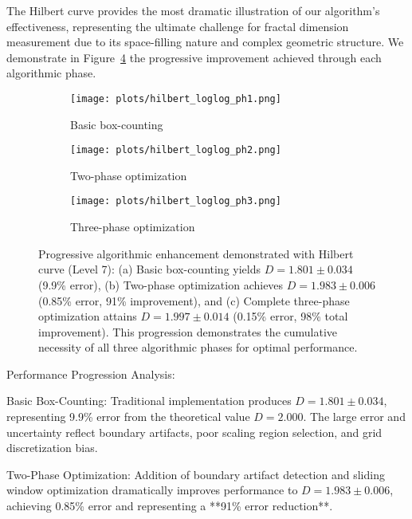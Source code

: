 \documentclass[preprint,12pt]{elsarticle}
\def\textbf#1{#1}%
\begin{document}
The Hilbert curve provides the most dramatic illustration of our algorithm's effectiveness, representing the ultimate challenge for fractal dimension measurement due to its space-filling nature and complex geometric structure. We demonstrate in Figure~\ref{fig:hilbert_progression} the progressive improvement achieved through each algorithmic phase.

\begin{figure}[H]
\centering
\begin{subfigure}[b]{0.32\textwidth}
    \centering
    \texttt{[image: plots/hilbert\_loglog\_ph1.png]}
    \caption{Basic box-counting}
    \label{fig:hilbert_basic}
\end{subfigure}
\hfill
\begin{subfigure}[b]{0.32\textwidth}
    \centering
    \texttt{[image: plots/hilbert\_loglog\_ph2.png]}
    \caption{Two-phase optimization}
    \label{fig:hilbert_two_phase}
\end{subfigure}
\hfill
\begin{subfigure}[b]{0.32\textwidth}
    \centering
    \texttt{[image: plots/hilbert\_loglog\_ph3.png]}
    \caption{Three-phase optimization}
    \label{fig:hilbert_three_phase}
\end{subfigure}

\caption{Progressive algorithmic enhancement demonstrated with Hilbert curve (Level 7): (a) Basic box-counting yields $D = 1.801 \pm 0.034$ (9.9\% error), (b) Two-phase optimization achieves $D = 1.983 \pm 0.006$ (0.85\% error, 91\% improvement), and (c) Complete three-phase optimization attains $D = 1.997 \pm 0.014$ (0.15\% error, 98\% total improvement). This progression demonstrates the cumulative necessity of all three algorithmic phases for optimal performance.}
\label{fig:hilbert_progression}
\end{figure}

\textbf{Performance Progression Analysis}:

\textbf{Basic Box-Counting}: Traditional implementation produces $D = 1.801 \pm 0.034$, representing 9.9\% error from the theoretical value $D = 2.000$. The large error and uncertainty reflect boundary artifacts, poor scaling region selection, and grid discretization bias.

\textbf{Two-Phase Optimization}: Addition of boundary artifact detection and sliding window optimization dramatically improves performance to $D = 1.983 \pm 0.006$, achieving 0.85\% error and representing a **91\% error reduction**.
\end{document}
